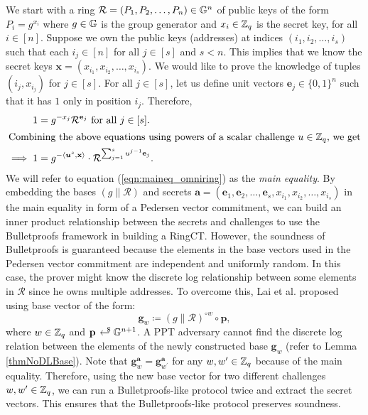 We start with a ring $\mathcal{R} = (P_1, P_2, \dots, P_n) \in \mathbb{G}^n$ of public keys of the form $P_i = g^{x_i}$ where $g \in \mathbb{G}$ is the group generator and $x_i \in \mathbb{Z}_q$ is the secret key, for all $i \in [n]$.
Suppose we own the public keys (addresses) at indices $(i_1, i_2, \dots, i_s)$ such that each $i_j \in [n]$ for all $j \in [s]$ and $s < n$.
This implies that we know the secret keys $\textbf{x} = (x_{i_1}, x_{i_2}, \dots, x_{i_s})$.
We would like to prove the knowledge of tuples $(i_j, x_{i_j})$ for $j \in [s]$.
For all $j\in [s]$, let us define unit vectors $\textbf{e}_{j} \in \{0,1\}^n$ such that it has $1$ only in position $i_j$.
Therefore,
\begin{align}
    1 &= g^{-x_j} \mathcal{R}^{\textbf{e}_{j}} \text{ for all } j \in [s]. \nonumber \\
    \intertext{Combining the above equations using powers of a scalar challenge $u \in \mathbb{Z}_q$, we get}
    \implies 1 &= g^{- \langle {\boldsymbol{u}}^s, \textbf{x} \rangle} \cdot \mathcal{R}^{\sum_{j=1}^s u^{j-1} \textbf{e}_{j}}.
    \label{eqn:maineq_omniring}
\end{align}
We will refer to equation (\ref{eqn:maineq_omniring}) as the \textit{main equality}.
By embedding the bases $(g \| \mathcal{R})$ and secrets $\textbf{a} = (\textbf{e}_{1}, \textbf{e}_2, \dots, \textbf{e}_s, x_{i_1}, x_{i_2}, \dots, x_{i_s})$ in the main equality in form of a Pedersen vector commitment, we can build an inner product relationship between the secrets and challenges to use the Bulletproofs framework in building a RingCT.
However, the soundness of Bulletproofs is guaranteed because the elements in the base vectors used in the Pedersen vector commitment are independent and uniformly random.
In this case, the prover might know the discrete log relationship between some elements in $\mathcal{R}$ since he owns multiple addresses.
To overcome this, Lai et al. \cite{Lai2019} proposed using base vector of the form:
\begin{equation*}
    \textbf{g}_w \coloneqq (g \| \mathcal{R})^{\circ w} \circ \textbf{p},
\end{equation*}
where $w \in \mathbb{Z}_q$ and $\textbf{p} \rgen \G^{n+1}$. 
A \textsf{PPT} adversary cannot find the discrete log relation between the elements of the newly constructed base $\textbf{g}_w$ (refer to Lemma \ref{thmNoDLBase}).
Note that $\textbf{g}_w^{\textbf{a}} = \textbf{g}_{w^{\prime}}^{\textbf{a}}$ for any $w, w^{\prime} \in \mathbb{Z}_q$ because of the main equality.
Therefore, using the new base vector for two different challenges $w, w^{\prime} \in \mathbb{Z}_q$, we can run a Bulletproofs-like protocol twice and extract the secret vectors.
This ensures that the Bulletproofs-like protocol preserves soundness.




